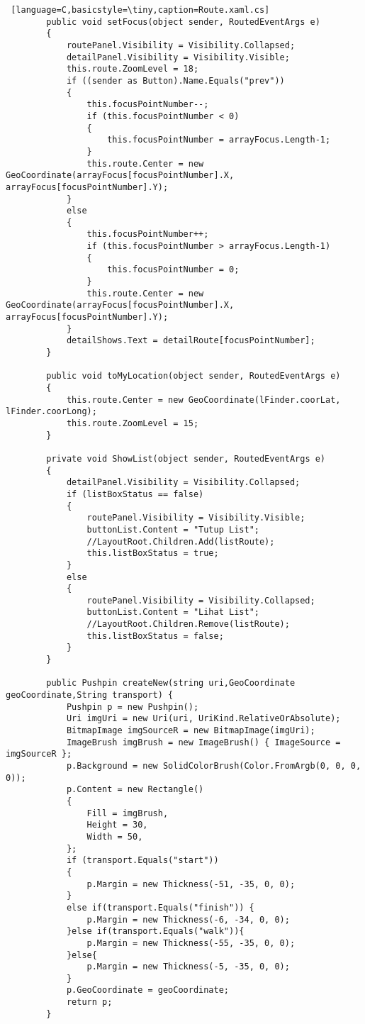 \begin{lstlisting} [language=C,basicstyle=\tiny,caption=Route.xaml.cs]
        public void setFocus(object sender, RoutedEventArgs e)
        {
            routePanel.Visibility = Visibility.Collapsed;
            detailPanel.Visibility = Visibility.Visible;
            this.route.ZoomLevel = 18;
            if ((sender as Button).Name.Equals("prev"))
            {   
                this.focusPointNumber--;
                if (this.focusPointNumber < 0)
                {
                    this.focusPointNumber = arrayFocus.Length-1;
                }
                this.route.Center = new GeoCoordinate(arrayFocus[focusPointNumber].X, arrayFocus[focusPointNumber].Y);
            }
            else 
            {
                this.focusPointNumber++;
                if (this.focusPointNumber > arrayFocus.Length-1)
                {
                    this.focusPointNumber = 0;
                }
                this.route.Center = new GeoCoordinate(arrayFocus[focusPointNumber].X, arrayFocus[focusPointNumber].Y);
            }
            detailShows.Text = detailRoute[focusPointNumber];
        }

        public void toMyLocation(object sender, RoutedEventArgs e)
        {
            this.route.Center = new GeoCoordinate(lFinder.coorLat, lFinder.coorLong);
            this.route.ZoomLevel = 15;
        }

        private void ShowList(object sender, RoutedEventArgs e)
        {
            detailPanel.Visibility = Visibility.Collapsed;
            if (listBoxStatus == false)
            {
                routePanel.Visibility = Visibility.Visible;
                buttonList.Content = "Tutup List";
                //LayoutRoot.Children.Add(listRoute);
                this.listBoxStatus = true;
            }
            else 
            {
                routePanel.Visibility = Visibility.Collapsed;
                buttonList.Content = "Lihat List";
                //LayoutRoot.Children.Remove(listRoute);
                this.listBoxStatus = false;
            }
        }

        public Pushpin createNew(string uri,GeoCoordinate geoCoordinate,String transport) {
            Pushpin p = new Pushpin();
            Uri imgUri = new Uri(uri, UriKind.RelativeOrAbsolute);
            BitmapImage imgSourceR = new BitmapImage(imgUri);
            ImageBrush imgBrush = new ImageBrush() { ImageSource = imgSourceR };
            p.Background = new SolidColorBrush(Color.FromArgb(0, 0, 0, 0));
            p.Content = new Rectangle()
            {
                Fill = imgBrush,
                Height = 30,
                Width = 50,
            };
            if (transport.Equals("start"))
            {
                p.Margin = new Thickness(-51, -35, 0, 0);
            }
            else if(transport.Equals("finish")) {
                p.Margin = new Thickness(-6, -34, 0, 0);
            }else if(transport.Equals("walk")){
                p.Margin = new Thickness(-55, -35, 0, 0);
            }else{
                p.Margin = new Thickness(-5, -35, 0, 0);
            }
            p.GeoCoordinate = geoCoordinate;
            return p;
        }


\end{lstlisting}
